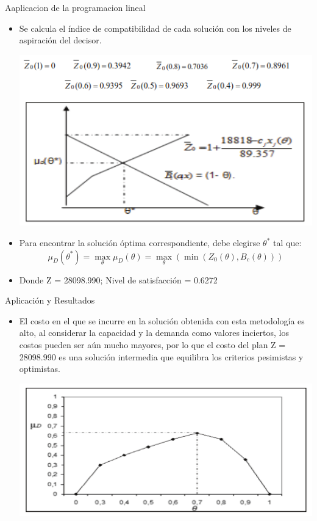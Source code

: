 \documentclass{beamer}
\begin{document}
\begin{frame}{Aaplicacion de la programacion lineal}
\begin{itemize}
    \item Se calcula el índice de compatibilidad de cada solución con los niveles de aspiración del decisor.
    
    \centering
    \includegraphics[width=0.65\linewidth]{pl_3.png}
    
    \item Para encontrar la solución óptima correspondiente, debe elegirse $\theta^*$ tal que:
\[
\mu_D(\theta^*) = \max_{\theta} \mu_D(\theta) = \max_{\theta} \left( \min \left( Z_0(\theta), B_c(\theta) \right) \right)
\]
    \item Donde Z = 28098.990; Nivel de satisfacción = 0.6272 
\end{itemize}
\end{frame}

\begin{frame}{Aplicación y Resultados}
\begin{itemize}
    \item El costo en el que se incurre en la solución obtenida con
esta metodología es alto, al considerar la capacidad y la demanda como valores inciertos, los costos pueden ser aún mucho mayores, por lo que el costo del plan Z = 28098.990 es una solución intermedia que equilibra los criterios pesimistas y optimistas.

    \centering
    \includegraphics[width=0.65\linewidth]{pl_4.png}
    
\end{itemize}
\end{frame}
\end{document}

